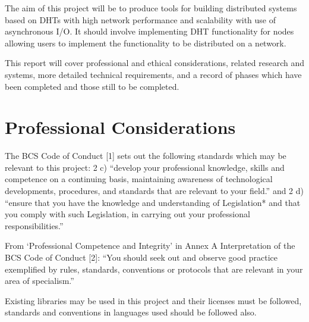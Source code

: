 \documentclass{article}
\begin{document}
The aim of this project will be to produce tools for building distributed systems based on DHTs with high network performance and scalability with use of asynchronous I/O. It should involve implementing DHT functionality for nodes allowing users to implement the functionality to be distributed on a network.

This report will cover professional and ethical considerations, related research and systems, more detailed technical requirements, and a record of phases which have been completed and those still to be completed.

\section{Professional Considerations}
The BCS Code of Conduct [1] sets out the following standards which may be relevant to this project: 2 c) “develop your professional knowledge, skills and competence on a continuing basis, maintaining awareness of technological developments, procedures, and standards that are relevant to your field.” and 2 d) “ensure that you have the knowledge and understanding of Legislation* and that you comply with such Legislation, in carrying out your professional responsibilities.”

From ‘Professional Competence and Integrity’ in Annex A Interpretation of the BCS Code of Conduct [2]: “You should seek out and observe good practice exemplified by rules, standards, conventions or protocols that are relevant in your area of specialism.”

Existing libraries may be used in this project and their licenses must be followed, standards and conventions in languages used should be followed also.
\end{document}
